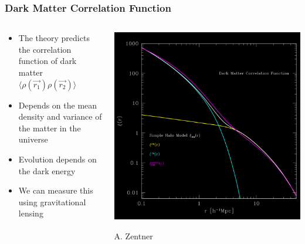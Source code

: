 \documentclass{beamer}
\begin{document}
\frame
{

    \frametitle{Dark Matter Correlation Function}


    \begin{columns}
        \begin{column}{0.5\textwidth}
            \begin{itemize}

                \item The theory predicts the correlation function of
                    dark matter {\color{gold} $\langle \rho(\vec{r_1}) \rho(\vec{r_2})
                    \rangle$ }

                \item Depends on the mean density and variance of the matter 
                    in the universe

                \item Evolution depends on the dark energy
 
                \item We can measure this using
                    {\color{lightskyblue} gravitational lensing}

            \end{itemize}

        \end{column}
        \begin{column}{0.5\textwidth}
            \begin{center}
                \includegraphics[width=\textwidth]{zentner-halo-model-inv.png}
            \end{center}
            {\tiny A. Zentner}
        \end{column}

    \end{columns}


}
\end{document}
